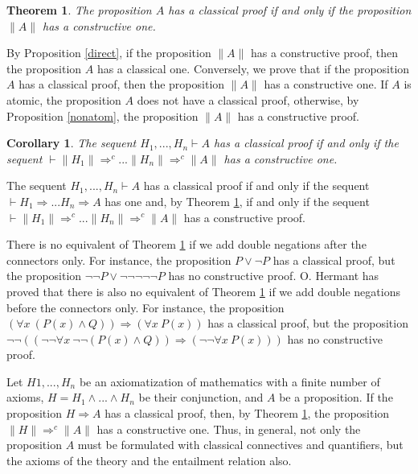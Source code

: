 \documentclass{article}
\newcommand{\fa}{\forall}
\newcommand{\Rightarrowc}{\Rightarrow^c}
\newtheorem{theorem}{Theorem}
\newtheorem{corollary}{Corollary}
\begin{document}
\begin{theorem}\label{main}
The proposition $A$ has a classical proof if and only if the proposition
$\|A\|$ has a constructive one.
\end{theorem}

By Proposition \ref{direct}, if the proposition $\|A\|$ has a
constructive proof, then the proposition $A$ has a classical one.
Conversely, we prove that if the proposition $A$ has a classical
proof, then the proposition $\|A\|$ has a constructive one.  If $A$
is atomic, the proposition $A$ does not have a classical proof,
otherwise, by Proposition \ref{nonatom}, the proposition $\|A\|$ has
a constructive proof.

\begin{corollary}
The sequent $H_1, ..., H_n \vdash A$ has a classical proof 
if and only if the sequent $\vdash \|H_1\| \Rightarrowc ...
\|H_n\| \Rightarrowc \|A\|$ has a constructive one.
\end{corollary}

The sequent $H_1, ..., H_n \vdash A$ has a classical proof
if and only if the sequent 
$\vdash H_1 \Rightarrow ...
H_n \Rightarrow A$ has one and, by Theorem \ref{main}, 
if and only if the sequent $\vdash \|H_1\| \Rightarrowc ...
\|H_n\| \Rightarrowc \|A\|$ has a constructive proof.

\smallskip

There is no equivalent of Theorem \ref{main} if we add double negations 
after the connectors only. For instance, the proposition
$P \vee \neg P$ has a classical proof, but the proposition
$\neg \neg P \vee \neg \neg \neg \neg \neg P$
has no constructive proof. O. Hermant \cite{Hermant} has proved that 
there is also no equivalent of Theorem \ref{main} if we add double 
negations 
before the connectors only. For instance, the proposition
$(\fa x~(P(x) \wedge Q)) \Rightarrow (\fa x~P(x))$ has a classical proof, 
but the 
proposition
$\neg \neg ((\neg \neg \fa x~\neg \neg (P(x) \wedge Q)) \Rightarrow 
(\neg \neg \fa x~P(x)))$ 
has no constructive proof.



Let $H1, ..., H_n$ be an axiomatization of mathematics with a finite
number of axioms, $H = H_1 \wedge ... \wedge H_n$ be their conjunction, 
and $A$ be a proposition. If the proposition
$H \Rightarrow A$ has a classical proof, then, by Theorem \ref{main}, 
the proposition $\|H\| \Rightarrowc \|A\|$ has a constructive one.  
Thus, in general, not only
the proposition $A$ must be formulated with classical connectives 
and quantifiers, but the axioms of the theory and the entailment relation 
also.
\end{document}
